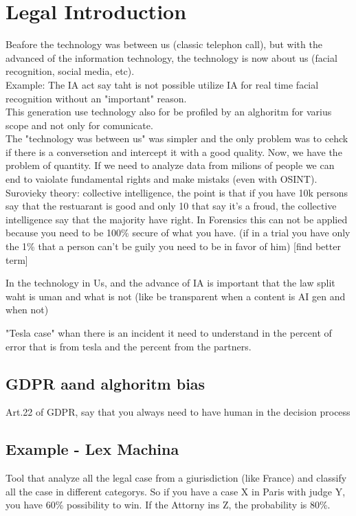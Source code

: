 \chapter{Legal Introduction}

Beafore the technology was between us (classic telephon call), but with the advanced of the information technology, 
the technology is now about us (facial recognition, social media, etc). \\
Example: The IA act say taht is not possible utilize IA for real time facial recognition without an "important" reason.\\
This generation use technology also for be profiled by an alghoritm for varius scope and not only for comunicate.   \\

The "technology was between us" was simpler and the only problem was to cehck if there is a conversetion and intercept it with a good quality. 
Now, we have the problem of quantity. If we need to analyze data from milions of people we can end to vaiolate fundamental rights and make mistaks
(even with OSINT). \\ 
Surovieky theory: collective intelligence, the point is that if you have 10k persons say that the restuarant is good and only 10 that say it's a froud,
 the collective intelligence say that the majority have right. In Forensics this can not be applied because you need to be 100\% secure of what you have.
(if in a trial you have only the 1\% that a person can't be guily you need to be in favor of him) [find better term]   

In the technology in Us, and the advance of IA is important that the law split waht is uman and what is not (like be transparent when a content is AI gen and when not)

"Tesla case" whan there is an incident it need to understand in the percent of error that is from tesla and the percent from the partners. 


\section{GDPR aand alghoritm bias}

Art.22 of GDPR, say that you always need to have human in the decision process

\section{Example - Lex Machina}
Tool that analyze all the legal case from a giurisdiction (like France) and classify 
all the case in different categorys.
So if you have a case X in Paris with judge Y, you have 60\% possibility to win. If the Attorny ins Z, the probability is 80\%.

